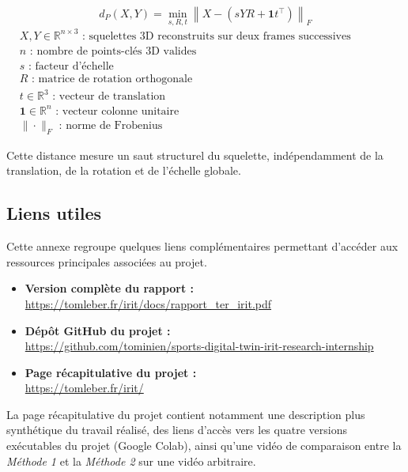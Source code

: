 \documentclass[11pt,a4paper]{article}
\begin{document}
\begin{center}
\[
    d_P(X,Y)
    =
    \min_{s,R,t}
    \left\|
        X - \left(sYR + \mathbf{1}t^\top\right)
    \right\|_F
\]
{\footnotesize
    \(
        \begin{aligned}
            &X,Y \in \mathbb{R}^{n \times 3} \text{ : squelettes 3D reconstruits sur deux frames successives} \\
            &n \text{ : nombre de points-clés 3D valides} \\
            &s \text{ : facteur d'échelle} \\
            &R \text{ : matrice de rotation orthogonale} \\
            &t \in \mathbb{R}^3 \text{ : vecteur de translation} \\
            &\mathbf{1} \in \mathbb{R}^{n} \text{ : vecteur colonne unitaire} \\
            &\|\cdot\|_F \text{ : norme de Frobenius}
        \end{aligned}
    \)
}
\end{center}

Cette distance mesure un saut structurel du squelette, indépendamment de la translation, de la rotation et de l'échelle globale.

\newpage
\subsection{Liens utiles}

Cette annexe regroupe quelques liens complémentaires permettant d'accéder aux ressources principales associées au projet.

\begin{itemize}
    \item \textbf{Version complète du rapport :}\\
    \url{https://tomleber.fr/irit/docs/rapport_ter_irit.pdf}

    \item \textbf{Dépôt GitHub du projet :}\\
    \url{https://github.com/tominien/sports-digital-twin-irit-research-internship}

    \item \textbf{Page récapitulative du projet :}\\
    \url{https://tomleber.fr/irit/}
\end{itemize}

La page récapitulative du projet contient notamment une description plus synthétique du travail réalisé, des liens d'accès vers les quatre versions exécutables du projet (Google Colab), ainsi qu'une vidéo de comparaison entre la \textit{Méthode 1} et la \textit{Méthode 2} sur une vidéo arbitraire.
\end{document}
